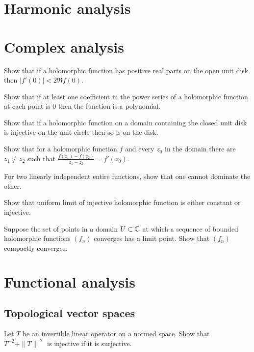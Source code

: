 \documentclass[11pt]{article}
\begin{document}
\section{Harmonic analysis}
\section{Complex analysis}

	\begin{prb}
	Show that if a holomorphic function has positive real parts on the open unit disk then $|f'(0)|<2\Re f(0)$.
	\end{prb}

	\begin{prb}
	Show that if at least one coefficient in the power series of a holomorphic function at each point is 0 then the function is a polynomial.
	\end{prb}

	\begin{prb}
	Show that if a holomorphic function on a domain containing the closed unit disk is injective on the unit circle then so is on the disk.
	\end{prb}

	\begin{prb}
	Show that for a holomorphic function $f$ and every $z_0$ in the domain there are $z_1\ne z_2$ such that $\frac{f(z_1)-f(z_2)}{z_1-z_2}=f'(z_0)$.
	\end{prb}

	\begin{prb}
	For two linearly independent entire functions, show that one cannot dominate the other.
	\end{prb}

	\begin{prb}
	Show that uniform limit of injective holomorphic function is either constant or injective.
	\end{prb}

	\begin{prb}
	Suppose the set of points in a domain $U\subset\mathbb{C}$ at which a sequence of bounded holomorphic functions $(f_n)$ converges has a limit point. Show that $(f_n)$ compactly converges.
	\end{prb}



\section{Functional analysis}
	\subsection{Topological vector spaces}
	\begin{prb}
	Let $T$ be an invertible linear operator on a normed space.
	Show that $T^{-2}+\|T\|^{-2}$ is injective if it is surjective.
	\end{prb}
\end{document}
